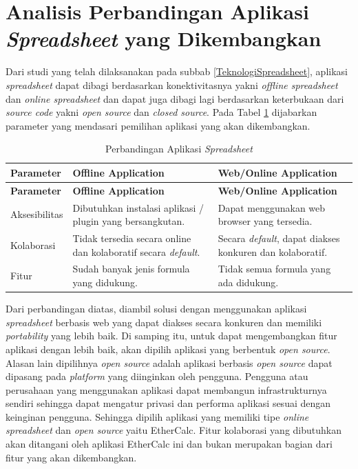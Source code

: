 \section{Analisis Perbandingan Aplikasi \textit{Spreadsheet} yang Dikembangkan}
Dari studi yang telah dilaksanakan pada subbab \ref{TeknologiSpreadsheet}, aplikasi \textit{spreadsheet} dapat dibagi berdasarkan konektivitasnya yakni \textit{offline spreadsheet} dan \textit{online spreadsheet} dan dapat juga dibagi lagi berdasarkan keterbukaan dari \textit{source code} yakni \textit{open source} dan \textit{closed source}. Pada Tabel \ref{AnalisisAplikasiDasar} dijabarkan parameter yang mendasari pemilihan aplikasi yang akan dikembangkan.

\begin{small}
\begin{longtable}{ | p{3cm} | p{4cm} | p{4cm} | }
    \caption{Perbandingan Aplikasi \textit{Spreadsheet}}
    \label{AnalisisAplikasiDasar}\\ \hline
    \centering\bfseries{Parameter} & \centering\bfseries{Offline Application} & \centering\bfseries{Web/Online Application} \tabularnewline \hline
    \endfirsthead
    \hline
    \centering\bfseries{Parameter} & \centering\bfseries{Offline Application} & \centering\bfseries{Web/Online Application} \tabularnewline \hline
    \endhead
    Aksesibilitas & Dibutuhkan instalasi aplikasi / plugin yang bersangkutan. & Dapat menggunakan web browser yang tersedia. \\ \hline
    Kolaborasi & Tidak tersedia secara online dan kolaboratif secara \textit{default}. & Secara \textit{default}, dapat diakses konkuren dan kolaboratif. \\ \hline
    Fitur & Sudah banyak jenis formula yang didukung. & Tidak semua formula yang ada didukung. \\ \hline
\end{longtable}
\end{small}

Dari perbandingan diatas, diambil solusi dengan menggunakan aplikasi \textit{spreadsheet} berbasis web yang dapat diakses secara konkuren dan memiliki \textit{portability} yang lebih baik. Di samping itu, untuk dapat mengembangkan fitur aplikasi dengan lebih baik, akan dipilih aplikasi yang berbentuk \textit{open source}. Alasan lain dipilihnya \textit{open source} adalah aplikasi berbasis \textit{open source} dapat dipasang pada \textit{platform} yang diinginkan oleh pengguna. Pengguna atau perusahaan yang menggunakan aplikasi dapat membangun infrastrukturnya sendiri sehingga dapat mengatur privasi dan performa aplikasi sesuai dengan keinginan pengguna. Sehingga dipilih aplikasi yang memiliki tipe \textit{online spreadsheet} dan \textit{open source} yaitu EtherCalc. Fitur kolaborasi yang dibutuhkan akan ditangani oleh aplikasi EtherCalc ini dan bukan merupakan bagian dari fitur yang akan dikembangkan.

